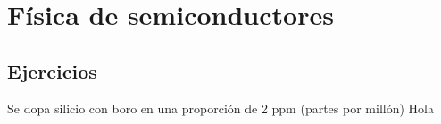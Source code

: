 
\chapter{Física de semiconductores}


\section{Ejercicios}

\begin{texercise}
    Se dopa silicio con boro en una proporción de 2 ppm (partes por millón)
    \tcblower
	Hola
\end{texercise}